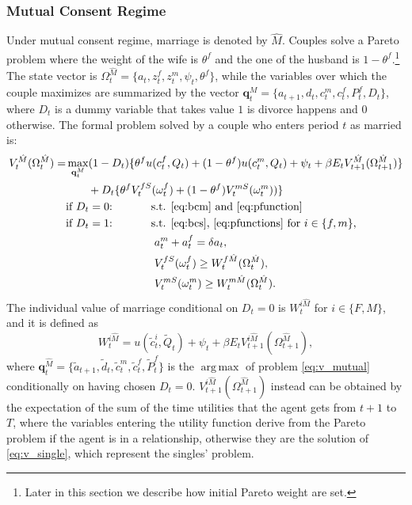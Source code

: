 \documentclass[12pt]{article}
\numberwithin{table}{section}
\DeclareMathOperator*{\argmax}{arg\,max}
\begin{document}
\subsubsection*{Mutual Consent Regime}
Under mutual consent regime, marriage is denoted by $\hat{M}$. Couples solve a Pareto problem where the weight of the wife is $\theta^f$ and the one of the husband is $1-\theta^f$.\footnote{Later in this section we describe how initial Pareto weight are set.} The state vector is $\Omega^{\hat{M}}_t=\{a_t,z^f_t,z^m_t,\psi_t,\theta^f\}$, while the variables over which the couple maximizes are summarized by the vector $\mathbf{q}^M_t=\{a_{t+1},d_{t},c^m_{t},c^f_{t},P^f_t,D_t\}$, where $D_t$ is a dummy variable that takes value $1$ is divorce happens and $0$ otherwise. The formal problem solved by a couple who enters period $t$ as married is:
\begin{equation}\label{eq:v_mutual}
\begin{split}
V_t^{\hat{M}}(\Omega^{\hat{M}}_t)=&\max_{\mathbf{q}^M_t} (1-D_t)\{\theta^f u(c^f_t,Q_t)+(1-\theta^f)u(c^m_t,Q_t)+\psi_t+\beta E_t V^{\hat{M}}_{t+1}(\Omega^{\hat{M}}_{t+1})\}\\ &\quad\quad+D_t \{\theta^fV^{fS}_{t}(\omega^{f}_{t})+(1-\theta^f)  V^{mS}_{t}(\omega^{m}_{t}))\}
\\ &\text{if $D_t=0$:}\hspace{35pt}\text{s.t. \eqref{eq:bcm} and \eqref{eq:pfunction}
}
\\ &\text{if $D_t=1$:}\hspace{35pt}\text{s.t. \eqref{eq:bcs}, \eqref{eq:pfunctions} for $i\in\{f,m\}$,}\\ &
\hspace{80pt}a_t^m+a_t^f=\delta a_t,	\\ &\hspace{80pt}
V_{t}^{fS}(\omega^f_{t})\ge W^{f\hat{M}}_{t}(\Omega^{\hat{M}}_{t}),\\ &\hspace{80pt}
V_{t}^{mS}(\omega^m_{t})\ge W^{m\hat{M}}_{t}(\Omega^{\hat{M}}_{t}).
\end{split}
\end{equation}
The individual value of marriage conditional on $D_t=0$ is $W_{t}^{i\hat{M}}$ for $i\in\{F,M\}$, and it is defined as 
\begin{equation}
W_{t}^{i\hat{M}}=u(\tilde{c}_t^{i},\tilde{Q}_t)+\psi_t+\beta E_t V_{t+1}^{i\hat{M}}(\Omega^{\hat{M}}_{t+1}),
\end{equation}
where $\mathbf{q}^{\hat{M}}_t=\{\tilde{a}_{t+1},\tilde{d}_{t},\tilde{c}^{m}_{t},\tilde{c}^{f}_{t},\tilde{P}^{f}_t\}$ is the $\argmax$ of problem \eqref{eq:v_mutual} conditionally on having chosen $D_t=0$. $V_{t+1}^{i\hat{M}}(\Omega^{\hat{M}}_{t+1})$ instead can be obtained by the expectation of the sum of the time utilities that the agent gets from $t+1$ to $T$, where the variables entering the utility function derive from the Pareto problem if the agent is in a relationship, otherwise they are the solution of \eqref{eq:v_single}, which represent the singles' problem.
\end{document}
